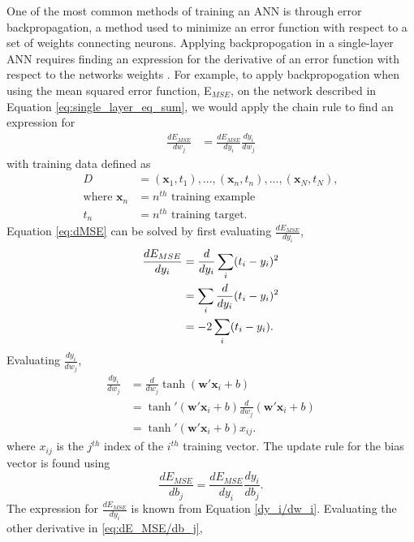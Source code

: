 One of the most common methods of training an ANN is through error backpropagation, a method used to minimize an error function with respect to a set of weights connecting neurons. Applying backpropogation in a single-layer ANN requires finding an expression for the derivative of an error function with respect to the networks weights \cite{Nielsen2015}. For example, to apply backpropogation when using the mean squared error function, E$_{MSE}$, on the network described in Equation \ref{eq:single_layer_eq_sum}, we would apply the chain rule to find an expression for
%
\begin{align} \label{eq:dMSE}
\frac{dE_{MSE}}{dw_j} &= \frac{dE_{MSE}}{dy_i} \frac{dy_i}{dw_j}
\end{align}
%
with training data defined as %
\begin{align} \label{eq:train_data_D}
D&={(\boldsymbol{x}_1,t_1), ... , (\boldsymbol{x}_n,t_n), ... , (\boldsymbol{x}_N,t_N)}, \\
\text{where } \boldsymbol{x}_{n} &= n^{th} \text{ training example} \nonumber \\
t_n &= n^{th} \text{ training target.} \nonumber
\end{align}
%
Equation \ref{eq:dMSE} can be solved by first evaluating $\frac{dE_{MSE}}{dy_i}$,
%
\begin{align} \label{dE_{MSE}/dy_i}
\frac{dE_{MSE}}{dy_i}  &= \frac{d}{dy_i} \sum_i(t_i - y_i)^2 \\
&= \sum_i  \frac{d}{dy_i} (t_i - y_i)^2 \nonumber \\
&=  -2 \sum_i  (t_i - y_i). \nonumber
\end{align}
%
Evaluating $\frac{dy_i}{dw_j}$,
%
\begin{align} \label{dy_i/dw_i}
\frac{dy_i}{dw_j}  &= \frac{d}{dw_j} \tanh( \boldsymbol{w}' \boldsymbol{x}_i + b) \\
&= \tanh'( \boldsymbol{w}' \boldsymbol{x}_i + b) \frac{d}{dw_j}( \boldsymbol{w}' \boldsymbol{x}_i + b) \nonumber \\
&= \tanh'( \boldsymbol{w}' \boldsymbol{x}_i + b)  x_{ij}. \nonumber
\end{align}
%
\noindent where $x_{ij}$ is the $j^{th}$ index of the $i^{th}$ training vector.
%
The update rule for the bias vector is found using
%
\begin{equation} \label{eq:dE_MSE/db_j}
\frac{dE_{MSE}}{db_j} = \frac{dE_{MSE}}{dy_i} \frac{dy_i}{db_j}.
\end{equation}
%
The expression for $\frac{dE_{MSE}}{dy_i}$ is known from Equation \ref{dy_i/dw_i}. Evaluating the other derivative in \ref{eq:dE_MSE/db_j},
